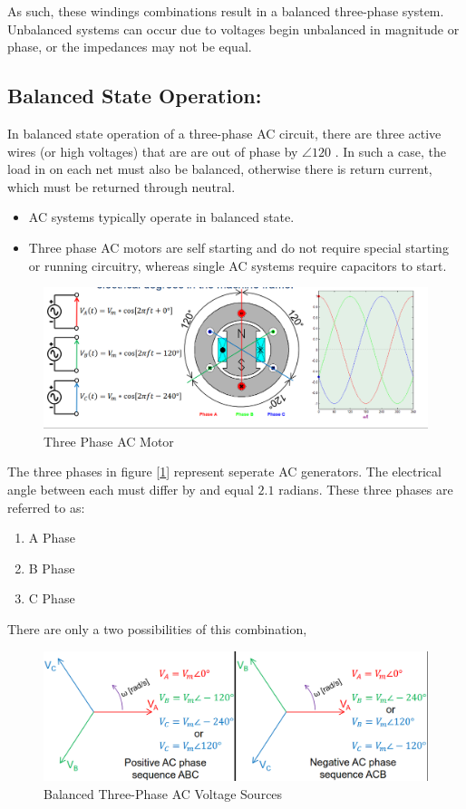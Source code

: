 \documentclass{book}
\begin{document}
As such, these windings combinations result in a balanced three-phase system. Unbalanced systems can occur due to voltages begin unbalanced in magnitude or phase, or the impedances may not be equal.
\subsection{Balanced State Operation:} In balanced state operation of a three-phase AC circuit, there are three active wires (or high voltages) that are are out of phase by $\angle120$ . In such a case, the load in on each net must also be balanced, otherwise there is return current, which must be returned through neutral.


\begin{itemize}
	\item AC systems typically operate in balanced state.
	\item Three phase AC motors are self starting and do not require special starting or running circuitry, whereas single AC systems require capacitors to start.
\end{itemize}

\begin{figure}[h]
	\centering
	\includegraphics[width=0.4\linewidth]{Screenshots/real_cap_model}
	\caption{Three Phase AC Motor}
	\label{fig:three_phase}
\end{figure}

The three phases in figure [\ref{fig:three_phase}] represent seperate AC generators. The electrical angle between each must differ by and equal $2.1$ radians. These three phases are referred to as:

\begin{enumerate}
	\item A Phase
	\item B Phase
	\item C Phase
\end{enumerate}

There are only a two possibilities of this combination, 
\begin{figure}[h]
	\centering
	\includegraphics[width=0.4\linewidth]{Screenshots/balance_3phase}
	\caption{Balanced Three-Phase AC Voltage Sources}
	\label{fig:balance3phase}
\end{figure}
\end{document}
